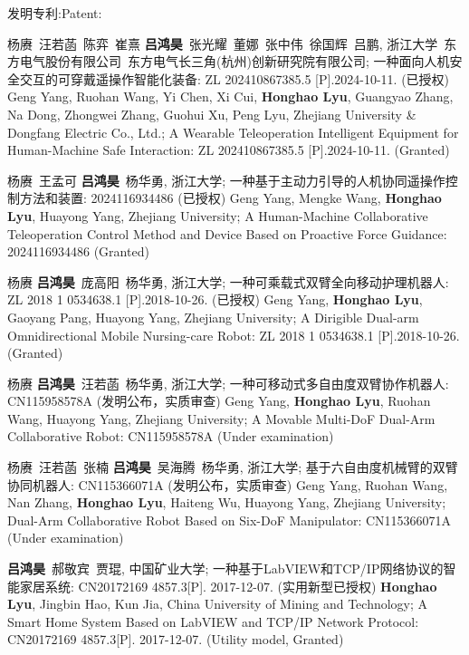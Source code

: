 \resumePOR{}
    {\ifchinese 发明专利:\else Patent:\fi}
    {}
\resumeItemListStart
\begin{enumerate}[align=left, widest={[\textbf{S.1}]}, itemindent=0em, label={\textbf{[\arabic*]}]}]
    \item[\textbf{[P.6]}] \ifchinese
        杨赓\ 汪若菡\ 陈弈\ 崔熹 \textbf{吕鸿昊}\ 张光耀\ 董娜\ 张中伟\ 徐国辉\ 吕鹏, 浙江大学\ 东方电气股份有限公司\ 东方电气长三角(杭州)创新研究院有限公司; 一种面向人机安全交互的可穿戴遥操作智能化装备: ZL 202410867385.5 [P].2024-10-11. (已授权)
    \else
        Geng Yang, Ruohan Wang, Yi Chen, Xi Cui, \textbf{Honghao Lyu}, Guangyao Zhang, Na Dong, Zhongwei Zhang, Guohui Xu, Peng Lyu, Zhejiang University \& Dongfang Electric Co., Ltd.; A Wearable Teleoperation Intelligent Equipment for Human-Machine Safe Interaction: ZL 202410867385.5 [P].2024-10-11. (Granted)
    \fi
    \item[\textbf{[P.5]}] \ifchinese
        杨赓\ 王孟可 \textbf{吕鸿昊}\ 杨华勇, 浙江大学; 一种基于主动力引导的人机协同遥操作控制方法和装置: 2024116934486 (已授权)
    \else
        Geng Yang, Mengke Wang, \textbf{Honghao Lyu}, Huayong Yang, Zhejiang University; A Human-Machine Collaborative Teleoperation Control Method and Device Based on Proactive Force Guidance: 2024116934486 (Granted)
    \fi
    \item[\textbf{[P.4]}] \ifchinese
        杨赓 \textbf{吕鸿昊}\ 庞高阳\ 杨华勇, 浙江大学; 一种可乘载式双臂全向移动护理机器人: ZL 2018 1 0534638.1 [P].2018-10-26. (已授权)
    \else
        Geng Yang, \textbf{Honghao Lyu}, Gaoyang Pang, Huayong Yang, Zhejiang University; A Dirigible Dual-arm Omnidirectional Mobile Nursing-care Robot: ZL 2018 1 0534638.1 [P].2018-10-26. (Granted)
    \fi
    \item[\textbf{[P.3]}] \ifchinese
        杨赓 \textbf{吕鸿昊}\ 汪若菡\ 杨华勇, 浙江大学; 一种可移动式多自由度双臂协作机器人: CN115958578A (发明公布，实质审查)
    \else
        Geng Yang, \textbf{Honghao Lyu}, Ruohan Wang, Huayong Yang, Zhejiang University; A Movable Multi-DoF Dual-Arm Collaborative Robot: CN115958578A (Under examination)
    \fi
    \item[\textbf{[P.2]}] \ifchinese
        杨赓\ 汪若菡\ 张楠 \textbf{吕鸿昊}\ 吴海腾\ 杨华勇, 浙江大学; 基于六自由度机械臂的双臂协同机器人: CN115366071A (发明公布，实质审查)
    \else
        Geng Yang, Ruohan Wang, Nan Zhang, \textbf{Honghao Lyu}, Haiteng Wu, Huayong Yang, Zhejiang University; Dual-Arm Collaborative Robot Based on Six-DoF Manipulator: CN115366071A (Under examination)
    \fi
    \item[\textbf{[P.1]}] \ifchinese
        \textbf{吕鸿昊}\ 郝敬宾\ 贾琨, 中国矿业大学; 一种基于LabVIEW和TCP/IP网络协议的智能家居系统: CN20172169 4857.3[P]. 2017-12-07. (实用新型已授权)
    \else
        \textbf{Honghao Lyu}, Jingbin Hao, Kun Jia, China University of Mining and Technology; A Smart Home System Based on LabVIEW and TCP/IP Network Protocol: CN20172169 4857.3[P]. 2017-12-07. (Utility model, Granted)
    \fi
\end{enumerate}
\resumeItemListEnd

